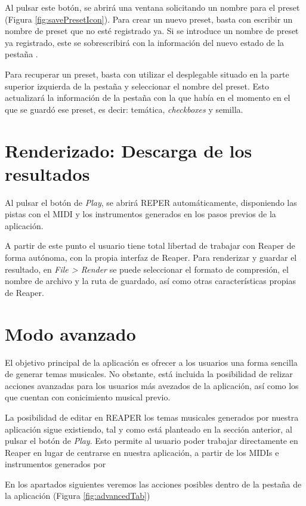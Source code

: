 Al pulsar este botón, se abrirá una ventana solicitando un nombre para el preset (Figura \ref{fig:savePresetIcon}). Para crear un nuevo preset, basta con escribir un nombre de preset que no esté registrado ya. Si se introduce un nombre de preset ya registrado, este se sobrescribirá con la información del nuevo estado de la pestaña \tematicTabName{}.

Para recuperar un preset, basta con utilizar el desplegable situado en la parte superior izquierda de la pestaña y seleccionar el nombre del preset. Esto actualizará la información de la pestaña con la que había en el momento en el que se guardó ese preset, es decir: temática, \textit{checkboxes} y semilla.

\section{Renderizado: Descarga de los resultados}
Al pulsar el botón de \textit{Play}, se abrirá REPER automáticamente, disponiendo las pistas con el MIDI y los instrumentos generados en los pasos previos de la aplicación.

A partir de este punto el usuario tiene total libertad de trabajar con Reaper de forma autónoma, con la propia interfaz de Reaper. Para renderizar y guardar el resultado, en \textit{File > Render} se puede seleccionar el formato de compresión, el nombre de archivo y la ruta de guardado, así como otras características propias de Reaper.

\section{Modo avanzado}
\label{sec:app:advancedMode}
El objetivo principal de la aplicación es ofrecer a los usuarios una forma sencilla de generar temas musicales. No obstante, está incluida la posibilidad de relizar acciones avanzadas para los usuarios más avezados de la aplicación, así como los que cuentan con conicimiento musical previo.

La posibilidad de editar en REAPER los temas musicales generados por nuestra aplicación sigue existiendo, tal y como está planteado en la sección anterior, al pulsar el botón de \textit{Play}. Esto permite al usuario poder trabajar directamente en Reaper en lugar de centrarse en nuestra aplicación, a partir de los MIDIs e instrumentos generados por \appName{}

En los apartados siguientes veremos las acciones posibles dentro de la pestaña \advancedTabName{} de la aplicación (Figura \ref{fig:advancedTab})

